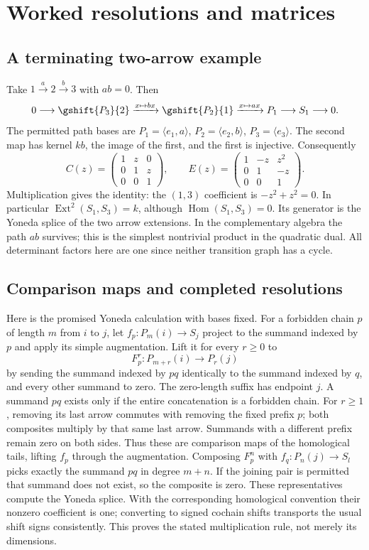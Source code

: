 \appendix
\section{Worked resolutions and matrices}
\subsection{A terminating two-arrow example}
Take $1\xrightarrow{a}2\xrightarrow{b}3$ with $ab=0$. Then
\[
 0\longrightarrow \gshift{P_3}{2}\xrightarrow{x\mapsto bx}\gshift{P_2}{1}
 \xrightarrow{x\mapsto ax}P_1\longrightarrow S_1\longrightarrow0.
\]
The permitted path bases are $P_1=\langle e_1,a\rangle$, $P_2=\langle e_2,b\rangle$, $P_3=\langle e_3\rangle$. The second map has kernel $kb$, the image of the first, and the first is injective. Consequently
\[
 C(z)=\begin{pmatrix}1&z&0\\0&1&z\\0&0&1\end{pmatrix},\qquad
 E(z)=\begin{pmatrix}1&-z&z^2\\0&1&-z\\0&0&1\end{pmatrix}.
\]
Multiplication gives the identity: the $(1,3)$ coefficient is $-z^2+z^2=0$. In particular $\operatorname{Ext}^2(S_1,S_3)=k$, although $\operatorname{Hom}(S_1,S_3)=0$. Its generator is the Yoneda splice of the two arrow extensions. In the complementary algebra the path $ab$ survives; this is the simplest nontrivial product in the quadratic dual. All determinant factors here are one since neither transition graph has a cycle.

\subsection{Comparison maps and completed resolutions}
Here is the promised Yoneda calculation with bases fixed. For a forbidden chain $p$ of length $m$ from $i$ to $j$, let $f_p:P_m(i)\to S_j$ project to the summand indexed by $p$ and apply its simple augmentation. Lift it for every $r\geq0$ to
\[
 F_p^r:P_{m+r}(i)\longrightarrow P_r(j)
\]
by sending the summand indexed by $pq$ identically to the summand indexed by $q$, and every other summand to zero. The zero-length suffix has endpoint $j$. A summand $pq$ exists only if the entire concatenation is a forbidden chain. For $r\geq1$, removing its last arrow commutes with removing the fixed prefix $p$; both composites multiply by that same last arrow. Summands with a different prefix remain zero on both sides. Thus these are comparison maps of the homological tails, lifting $f_p$ through the augmentation. Composing $F_p^n$ with $f_q:P_n(j)\to S_l$ picks exactly the summand $pq$ in degree $m+n$. If the joining pair is permitted that summand does not exist, so the composite is zero. These representatives compute the Yoneda splice. With the corresponding homological convention their nonzero coefficient is one; converting to signed cochain shifts transports the usual shift signs consistently. This proves the stated multiplication rule, not merely its dimensions.

